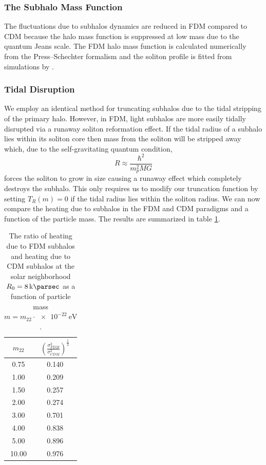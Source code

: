 \documentclass[usenatbib]{mnras}
\begin{document}
\subsubsection{The Subhalo Mass Function}

The fluctuations due to subhalos dynamics are reduced in FDM compared to CDM because the halo mass function is suppressed at low mass due to the quantum Jeans scale. The FDM halo mass function is calculated numerically from the Press--Schechter formalism \citep{substructure_FDM, marsh} and the soliton profile is fitted from simulations by \cite{schive_solitons}. 


\subsubsection{Tidal Disruption}

We employ an identical method for truncating subhalos due to the tidal stripping of the primary halo. However, in FDM, light subhalos are more easily tidally disrupted via a runaway soliton reformation effect. If the tidal radius of a subhalo lies within its soliton core then mass from the soliton will be stripped away which, due to the self-gravitating quantum condition,
\begin{equation}
R \approx \frac{\hbar^2}{m_p^2 M G}
\end{equation} 
forces the soliton to grow in size causing a runaway effect which completely destroys the subhalo. This only requires us to modify our truncation function by setting $T_R(m) = 0$ if the tidal radius lies within the soliton radius. We can now compare the heating due to subhalos in the FDM and CDM paradigms and a function of the particle mass. The results are summarized in table \ref{FDM_ratio}.   

\begin{table} \label{FDM_ratio}
\begin{center}
 \begin{tabular}{||c c||} 
 \hline
 $m_{22}$ & $\left( \frac{\sigma_{FDM}^2}{\sigma_{CDM}^2} \right)^{\tfrac{1}{2}}$ \\ [2.5ex] 
 \hline\hline
 0.75 & 0.140 \\ 
 \hline
 1.00 & 0.209 \\
 \hline
 1.50 & 0.257 \\
 \hline
 2.00 & 0.274 \\
 \hline
 3.00 & 0.701 \\
 \hline
 4.00 & 0.838 \\
 \hline
 5.00 & 0.896 \\
 \hline
 10.00 & 0.976 \\ [1ex] 
 \hline
\end{tabular}
\end{center}
\caption{The ratio of heating due to FDM subhalos and heating due to CDM subhalos at the solar neighborhood $R_0 = \SI{8}{\kilo\parsec}$ as a function of particle mass $m = m_{22} \cdot \SI{e-22}{\electronvolt}$. }
\end{table}
\end{document}
